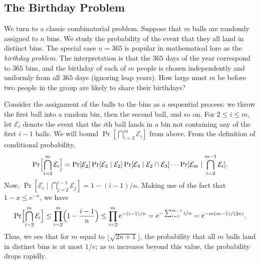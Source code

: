 \documentclass[twoside,12pt]{book}
\theoremstyle{plain}
\theoremstyle{definition}
\theoremstyle{remark}
\begin{document}
\subsection{The Birthday Problem}

We turn to a classic combinatorial problem. Suppose that $m$ balls are randomly assigned to $n$ bins. We study the probability of the event that they all land in distinct bins. The special case $n = 365$ is popular in mathematical lore as the \emph{birthday problem}. The interpretation is that the $365$ days of the year correspond to $365$ bins, and the birthday of each of $m$ people is chosen independently and uniformly from all $365$ days (ignoring leap years). How large must $m$ be before two people in the group are likely to share their birthdays?

Consider the assignment of the balls to the bins as a sequential process: we throw the first ball into a random bin, then the second ball, and so on. For $2 \leq i \leq m$, let $\mathcal{E}_i$ denote the event that the $i$th ball lands in a bin not containing any of the first $i-1$ balls. We will bound $\Pr[\bigcap_{i=2}^{m} \mathcal{E}_i]$ from above. From the definition of conditional probability,
\[
\Pr\Bigl[\bigcap_{i=2}^{m} \mathcal{E}_i\Bigr] = \Pr[\mathcal{E}_2] \Pr[\mathcal{E}_3 \mid \mathcal{E}_2] \Pr[\mathcal{E}_4 \mid \mathcal{E}_2 \cap \mathcal{E}_3] \cdots \Pr[\mathcal{E}_m \mid \bigcap_{i=2}^{m-1} \mathcal{E}_i].
\]
Now, $\Pr[\mathcal{E}_i \mid \bigcap_{j=2}^{i-1} \mathcal{E}_j] = 1 - (i-1)/n$. Making use of the fact that $1 - x \leq e^{-x}$, we have
\[
\Pr\Bigl[\bigcap_{i=2}^{m} \mathcal{E}_i\Bigr] \leq \prod_{i=2}^{m}\Bigl(1 - \frac{i-1}{n}\Bigr) \leq \prod_{i=2}^{m} e^{-(i-1)/n} = e^{-\sum_{i=1}^{m-1} i/n} = e^{-m(m-1)/(2n)}.
\]
Thus, we see that for $m$ equal to $\lfloor \sqrt{2n+1} \rfloor$, the probability that all $m$ balls land in distinct bins is at most $1/e$; as $m$ increases beyond this value, the probability drops rapidly.
\end{document}
